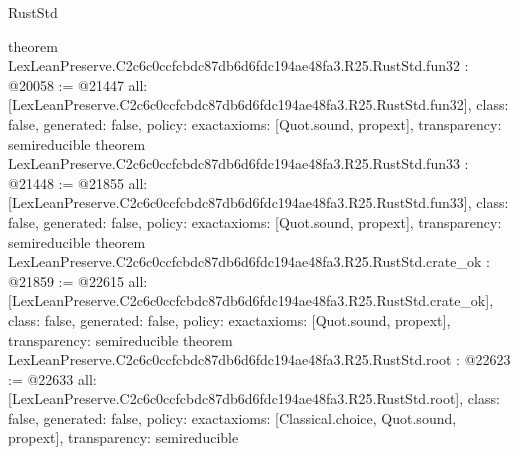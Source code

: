 \begin{lexlean}{RustStd}
\begin{coremodule}
{}
theorem LexLeanPreserve.C2c6c0ccfcbdc87db6d6fdc194ae48fa3.R25.RustStd.fun32 : @20058 := @21447 {
  all: [LexLeanPreserve.C2c6c0ccfcbdc87db6d6fdc194ae48fa3.R25.RustStd.fun32],
  class: false,
  generated: false,
  policy: exact{axioms: [Quot.sound, propext]},
  transparency: semireducible
}
theorem LexLeanPreserve.C2c6c0ccfcbdc87db6d6fdc194ae48fa3.R25.RustStd.fun33 : @21448 := @21855 {
  all: [LexLeanPreserve.C2c6c0ccfcbdc87db6d6fdc194ae48fa3.R25.RustStd.fun33],
  class: false,
  generated: false,
  policy: exact{axioms: [Quot.sound, propext]},
  transparency: semireducible
}
theorem LexLeanPreserve.C2c6c0ccfcbdc87db6d6fdc194ae48fa3.R25.RustStd.crate_ok : @21859 := @22615 {
  all: [LexLeanPreserve.C2c6c0ccfcbdc87db6d6fdc194ae48fa3.R25.RustStd.crate_ok],
  class: false,
  generated: false,
  policy: exact{axioms: [Quot.sound, propext]},
  transparency: semireducible
}
theorem LexLeanPreserve.C2c6c0ccfcbdc87db6d6fdc194ae48fa3.R25.RustStd.root : @22623 := @22633 {
  all: [LexLeanPreserve.C2c6c0ccfcbdc87db6d6fdc194ae48fa3.R25.RustStd.root],
  class: false,
  generated: false,
  policy: exact{axioms: [Classical.choice, Quot.sound, propext]},
  transparency: semireducible
}


\end{coremodule}
\end{lexlean}
